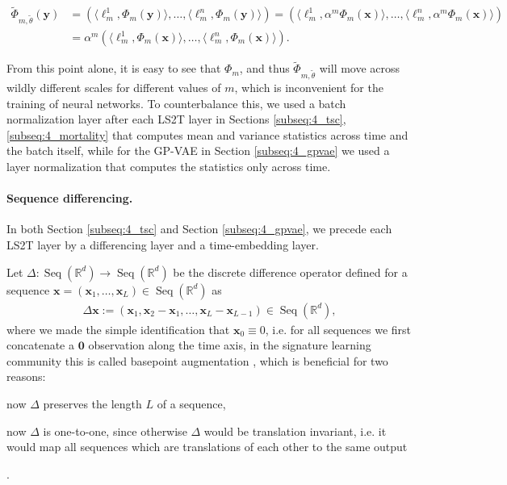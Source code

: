 \documentclass{article} \usepackage{iclr2021_conference,times}
\newcommand{\R}{\mathbb{R}}
\newcommand{\bx}{\mathbf{x}}
\newcommand{\by}{\mathbf{y}}
\newcommand{\Seq}[1]{\operatorname{Seq}(#1)}
\theoremstyle{plain}
\theoremstyle{definition}
\begin{document}
\begin{align}
    \tilde\Phi_{m, \tilde\theta} (\by) &= (\langle \ell^1_m, \Phi_m(\by) \rangle, \dots, \langle \ell^n_m, \Phi_m(\by) \rangle) 
    = (\langle \ell^1_m, \alpha^m \Phi_m(\bx) \rangle, \dots, \langle \ell^n_m, \alpha^m \Phi_m(\bx) \rangle) \\
    &= \alpha^m (\langle \ell^1_m, \Phi_m(\bx) \rangle, \dots, \langle \ell^n_m, \Phi_m(\bx) \rangle).
\end{align}

From this point alone, it is easy to see that $\Phi_m$, and thus $\tilde\Phi_{m, \tilde\theta}$ will move across wildly different scales for different values of $m$, which is inconvenient for the training of neural networks. To counterbalance this, we used a batch normalization layer after each LS2T layer in Sections \ref{subseq:4_tsc}, \ref{subseq:4_mortality} that computes mean and variance statistics across time and the batch itself, while for the GP-VAE in Section \ref{subseq:4_gpvae} we used a layer normalization that computes the statistics only across time. 

\paragraph{Sequence differencing.} In both Section \ref{subseq:4_tsc} and Section \ref{subseq:4_gpvae}, we precede each LS2T layer by a differencing layer and a time-embedding layer.

Let $\Delta: \Seq{\R^d} \rightarrow \Seq{\R^d}$ be the discrete difference operator defined for a sequence $\bx = (\bx_1, \dots, \bx_L) \in \Seq{\R^d}$ as
\begin{align}
    \Delta \bx := (\bx_1, \bx_2 - \bx_1, \dots, \bx_L - \bx_{L-1}) \in \Seq{\R^d},
\end{align}
where we made the simple identification that $\bx_0 \equiv 0$, i.e. for all sequences we first concatenate a $\mathbf{0}$ observation along the time axis, in the signature learning community this is called basepoint augmentation \cite{morrill2020generalised}, which is beneficial for two reasons: \begin{enumerate*}[label=(\roman*)] \item now $\Delta$ preserves the length $L$ of a sequence, \item now $\Delta$ is one-to-one, since otherwise $\Delta$ would be translation invariant, i.e. it would map all sequences which are translations of each other to the same output \end{enumerate*}.
\end{document}
